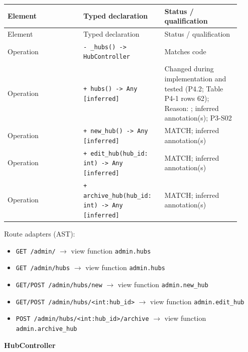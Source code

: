 \begin{longtable}{>{\raggedright\arraybackslash}p{0.3067\linewidth}>{\raggedright\arraybackslash}p{0.3067\linewidth}>{\raggedright\arraybackslash}p{0.3067\linewidth}}
Element & Typed declaration & Status / qualification \\
\hline\endfirsthead
Element & Typed declaration & Status / qualification \\
\hline\endhead
Operation & \texttt{- \_\allowbreak{}hubs() -\textgreater{} HubController} & Matches code \\
Operation & \texttt{+ hubs() -\textgreater{} Any [inferred] } & Changed during implementation and tested (P4.2; Table P4-1 rows 62); Reason: ; inferred annotation(s); P3-S02 \\
Operation & \texttt{+ new\_\allowbreak{}hub() -\textgreater{} Any [inferred]} & MATCH; inferred annotation(s) \\
Operation & \texttt{+ edit\_\allowbreak{}hub(hub\_\allowbreak{}id: int) -\textgreater{} Any [inferred]} & MATCH; inferred annotation(s) \\
Operation & \texttt{+ archive\_\allowbreak{}hub(hub\_\allowbreak{}id: int) -\textgreater{} Any [inferred]} & MATCH; inferred annotation(s) \\
\end{longtable}
Route adapters (AST):

\begin{itemize}
\item \texttt{GET /\allowbreak{}admin/\allowbreak{}} \ensuremath{\rightarrow} view function \texttt{admin.\allowbreak{}hubs}

\item \texttt{GET /\allowbreak{}admin/\allowbreak{}hubs} \ensuremath{\rightarrow} view function \texttt{admin.\allowbreak{}hubs}

\item \texttt{GET/\allowbreak{}POST /\allowbreak{}admin/\allowbreak{}hubs/\allowbreak{}new} \ensuremath{\rightarrow} view function \texttt{admin.\allowbreak{}new\_\allowbreak{}hub}

\item \texttt{GET/\allowbreak{}POST /\allowbreak{}admin/\allowbreak{}hubs/\allowbreak{}\textless{}int:hub\_\allowbreak{}id\textgreater{}} \ensuremath{\rightarrow} view function \texttt{admin.\allowbreak{}edit\_\allowbreak{}hub}

\item \texttt{POST /\allowbreak{}admin/\allowbreak{}hubs/\allowbreak{}\textless{}int:hub\_\allowbreak{}id\textgreater{}/\allowbreak{}archive} \ensuremath{\rightarrow} view function \texttt{admin.\allowbreak{}archive\_\allowbreak{}hub}

\end{itemize}
\textbf{HubController}

